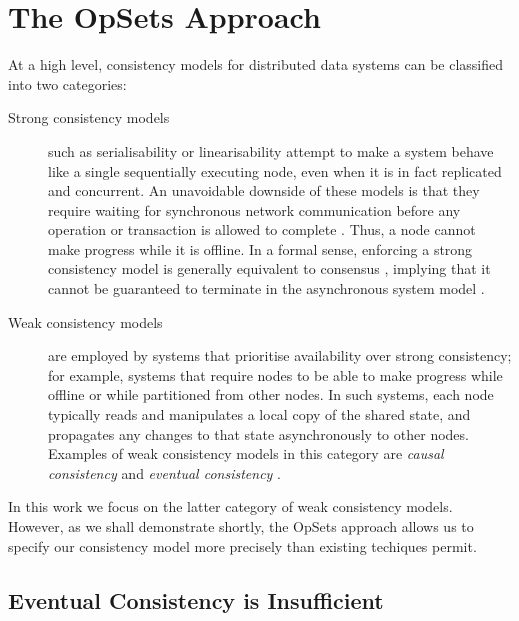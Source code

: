 \section{The OpSets Approach}\label{sec:approach}

At a high level, consistency models for distributed data systems can be classified into two categories:
\begin{description}
\item[Strong consistency models] such as serialisability or linearisability \cite{Herlihy:1990jq} attempt to make a system behave like a single sequentially executing node, even when it is in fact replicated and concurrent.
An unavoidable downside of these models is that they require waiting for synchronous network communication before any operation or transaction is allowed to complete \cite{Davidson:1985hv,Gilbert:2002il}.
Thus, a node cannot make progress while it is offline.
In a formal sense, enforcing a strong consistency model is generally equivalent to consensus \cite{Chandra:1996cp,Herlihy:1991gk}, implying that it cannot be guaranteed to terminate in the asynchronous system model \cite{Fischer:1985tt}.

\item[Weak consistency models] are employed by systems that prioritise availability over strong consistency; for example, systems that require nodes to be able to make progress while offline or while partitioned from other nodes.
In such systems, each node typically reads and manipulates a local copy of the shared state, and propagates any changes to that state asynchronously to other nodes.
Examples of weak consistency models in this category are \emph{causal consistency} \cite{Attiya:2015dm,Mahajan:2011wz,Lloyd:2011hz} and \emph{eventual consistency} \cite{Bailis:2013jc,Burckhardt:2014hy,Terry:1994fp,Vogels:2009ca}.
\end{description}

In this work we focus on the latter category of weak consistency models.
However, as we shall demonstrate shortly, the OpSets approach allows us to specify our consistency model more precisely than existing techiques permit.

\subsection{Eventual Consistency is Insufficient}

